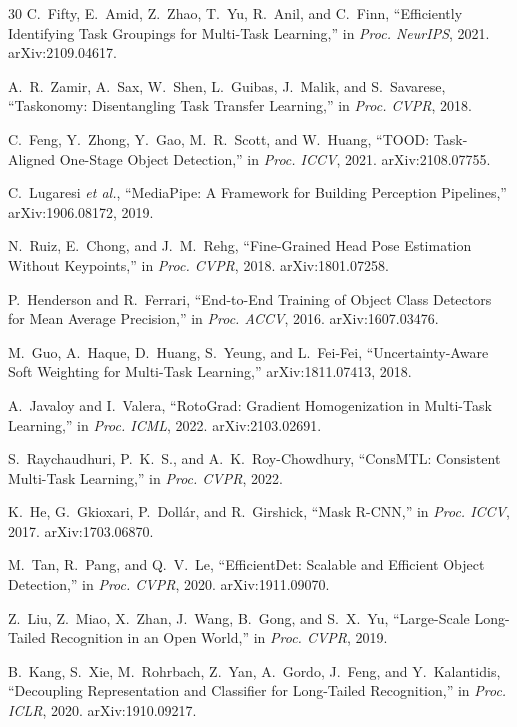 \documentclass[conference]{IEEEtran}
\begin{document}
\begin{thebibliography}{30}
C.~Fifty, E.~Amid, Z.~Zhao, T.~Yu, R.~Anil, and C.~Finn,
``Efficiently Identifying Task Groupings for Multi-Task Learning,''
in \emph{Proc. NeurIPS}, 2021.
arXiv:2109.04617.

A.~R.~Zamir, A.~Sax, W.~Shen, L.~Guibas, J.~Malik, and S.~Savarese,
``Taskonomy: Disentangling Task Transfer Learning,''
in \emph{Proc. CVPR}, 2018.

C.~Feng, Y.~Zhong, Y.~Gao, M.~R.~Scott, and W.~Huang,
``TOOD: Task-Aligned One-Stage Object Detection,''
in \emph{Proc. ICCV}, 2021.
arXiv:2108.07755.

C.~Lugaresi \emph{et al.},
``MediaPipe: A Framework for Building Perception Pipelines,''
arXiv:1906.08172, 2019.

N.~Ruiz, E.~Chong, and J.~M.~Rehg,
``Fine-Grained Head Pose Estimation Without Keypoints,''
in \emph{Proc. CVPR}, 2018.
arXiv:1801.07258.

P.~Henderson and R.~Ferrari,
``End-to-End Training of Object Class Detectors for Mean Average Precision,''
in \emph{Proc. ACCV}, 2016.
arXiv:1607.03476.

M.~Guo, A.~Haque, D.~Huang, S.~Yeung, and L.~Fei-Fei,
``Uncertainty-Aware Soft Weighting for Multi-Task Learning,''
arXiv:1811.07413, 2018.

A.~Javaloy and I.~Valera,
``RotoGrad: Gradient Homogenization in Multi-Task Learning,''
in \emph{Proc. ICML}, 2022.
arXiv:2103.02691.

S.~Raychaudhuri, P.~K.~S., and A.~K.~Roy-Chowdhury,
``ConsMTL: Consistent Multi-Task Learning,''
in \emph{Proc. CVPR}, 2022.

K.~He, G.~Gkioxari, P.~Doll\'{a}r, and R.~Girshick,
``Mask R-CNN,''
in \emph{Proc. ICCV}, 2017.
arXiv:1703.06870.

M.~Tan, R.~Pang, and Q.~V.~Le,
``EfficientDet: Scalable and Efficient Object Detection,''
in \emph{Proc. CVPR}, 2020.
arXiv:1911.09070.

Z.~Liu, Z.~Miao, X.~Zhan, J.~Wang, B.~Gong, and S.~X.~Yu,
``Large-Scale Long-Tailed Recognition in an Open World,''
in \emph{Proc. CVPR}, 2019.

B.~Kang, S.~Xie, M.~Rohrbach, Z.~Yan, A.~Gordo, J.~Feng, and Y.~Kalantidis,
``Decoupling Representation and Classifier for Long-Tailed Recognition,''
in \emph{Proc. ICLR}, 2020.
arXiv:1910.09217.


\end{thebibliography}
\end{document}
